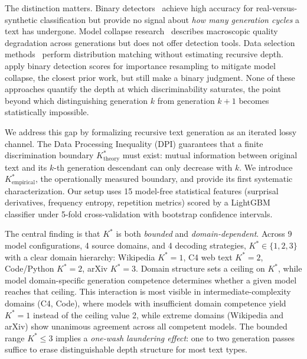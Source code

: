 \documentclass[11pt,a4paper]{article}
\begin{document}
The distinction matters. Binary detectors~\citep{mitchell2023detectgpt,hans2024binoculars} achieve high accuracy for real-versus-synthetic classification but provide no signal about \emph{how many generation cycles} a text has undergone. Model collapse research~\citep{shumailov2024model,alemohammad2024selfconsuming,dohmatob2024model} describes macroscopic quality degradation across generations but does not offer detection tools. Data selection methods~\citep{xie2023dsir,engstrom2024dsdm} perform distribution matching without estimating recursive depth. \citet{drayson2025} apply binary detection scores for importance resampling to mitigate model collapse, the closest prior work, but still make a binary judgment. None of these approaches quantify the depth at which discriminability saturates, the point beyond which distinguishing generation $k$ from generation $k\!+\!1$ becomes statistically impossible.

We address this gap by formalizing recursive text generation as an iterated lossy channel. The Data Processing Inequality (DPI) guarantees that a finite discrimination boundary $K^*_{\text{theory}}$ must exist: mutual information between original text and its $k$-th generation descendant can only decrease with $k$. We introduce $K^*_{\text{empirical}}$, the operationally measured boundary, and provide its first systematic characterization. Our setup uses 15 model-free statistical features (surprisal derivatives, frequency entropy, repetition metrics) scored by a LightGBM classifier under 5-fold cross-validation with bootstrap confidence intervals.

The central finding is that $K^*$ is both \emph{bounded} and \emph{domain-dependent}. Across 9 model configurations, 4 source domains, and 4 decoding strategies, $K^*\!\in\!\{1,2,3\}$ with a clear domain hierarchy: Wikipedia $K^*\!=\!1$, C4 web text $K^*\!=\!2$, Code/Python $K^*\!=\!2$, arXiv $K^*\!=\!3$. Domain structure sets a ceiling on $K^*$, while model domain-specific generation competence determines whether a given model reaches that ceiling. This interaction is most visible in intermediate-complexity domains (C4, Code), where models with insufficient domain competence yield $K^*\!=\!1$ instead of the ceiling value 2, while extreme domains (Wikipedia and arXiv) show unanimous agreement across all competent models. The bounded range $K^*\!\leq\!3$ implies a \emph{one-wash laundering effect}: one to two generation passes suffice to erase distinguishable depth structure for most text types.
\end{document}

